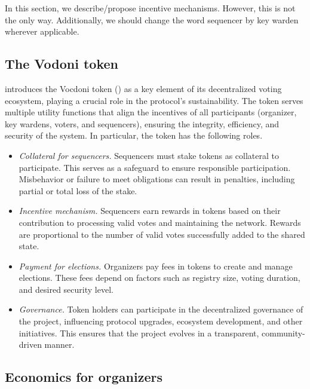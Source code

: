 
{\color{blue}In this section, we describe/propose incentive mechanisms. However, this is not the only way. Additionally, we should change the word sequencer by key warden wherever applicable.}

\subsection{The Vodoni token}

\Davinci introduces the Vocdoni token (\token) as a key element of its decentralized voting ecosystem, playing a crucial role in the protocol's sustainability.
The token serves multiple utility functions that align the incentives of all participants (organizer, key wardens, voters, and sequencers), ensuring the integrity, efficiency, and security of the system. In particular, the token has the following roles.

\begin{itemize}
	\item \emph{Collateral for sequencers.} Sequencers must stake \token tokens as collateral to participate. This serves as a safeguard to ensure responsible participation. Misbehavior or failure to meet obligations can result in penalties, including partial or total loss of the stake.
	\item \emph{Incentive mechanism.} Sequencers earn rewards in \token tokens based on their contribution to processing valid votes and maintaining the network. Rewards are proportional to the number of valid votes successfully added to the shared state.
	\item \emph{Payment for elections.} Organizers pay fees in \token tokens to create and manage elections. These fees depend on factors such as registry size, voting duration, and desired security level.
	\item \emph{Governance.} Token holders can participate in the decentralized governance of the project, influencing protocol upgrades, ecosystem development, and other initiatives. This ensures that the project evolves in a transparent, community-driven manner.
\end{itemize}

\subsection{Economics for organizers}


